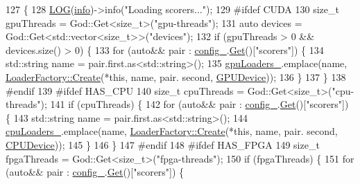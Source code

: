 \begin{DoxyCode}
127                       \{
128   \hyperlink{amun_2common_2logging_8h_a8cad147aca8c526d3c8a03ae14d5c87d}{LOG}(\hyperlink{namespacefix__hard_a31eedbb056537bc1bef47ad5e40eaa68}{info})->info(\textcolor{stringliteral}{"Loading scorers..."});
129 \textcolor{preprocessor}{#ifdef CUDA}
130   \textcolor{keywordtype}{size\_t} gpuThreads = God::Get<size\_t>(\textcolor{stringliteral}{"gpu-threads"});
131   \textcolor{keyword}{auto} devices = God::Get<std::vector<size\_t>>(\textcolor{stringliteral}{"devices"});
132   \textcolor{keywordflow}{if} (gpuThreads > 0 && devices.size() > 0) \{
133     \textcolor{keywordflow}{for} (\textcolor{keyword}{auto}&& pair : \hyperlink{classamunmt_1_1God_a5a0f3720bd8f1f19b7e50206e123f0e9}{config\_}.\hyperlink{classamunmt_1_1Config_a5257f41272d06c35bebe8130b5897d23}{Get}()[\textcolor{stringliteral}{"scorers"}]) \{
134       std::string name = pair.first.as<std::string>();
135       \hyperlink{classamunmt_1_1God_a2a713e550f5ee7296e7a66bd0b98339d}{gpuLoaders\_}.emplace(name, \hyperlink{classamunmt_1_1LoaderFactory_aaaf8621316a4c3832bcdfecbd5f69598}{LoaderFactory::Create}(*\textcolor{keyword}{this}, name, pair.
      second, \hyperlink{namespaceamunmt_a0f0dad0deb73c5a4c574d8c63833ab17a2ff3f7952956ae21ddcfa3564fe4de5f}{GPUDevice}));
136     \}
137   \}
138 \textcolor{preprocessor}{#endif}
139 \textcolor{preprocessor}{#ifdef HAS\_CPU}
140   \textcolor{keywordtype}{size\_t} cpuThreads = God::Get<size\_t>(\textcolor{stringliteral}{"cpu-threads"});
141   \textcolor{keywordflow}{if} (cpuThreads) \{
142     \textcolor{keywordflow}{for} (\textcolor{keyword}{auto}&& pair : \hyperlink{classamunmt_1_1God_a5a0f3720bd8f1f19b7e50206e123f0e9}{config\_}.\hyperlink{classamunmt_1_1Config_a5257f41272d06c35bebe8130b5897d23}{Get}()[\textcolor{stringliteral}{"scorers"}]) \{
143       std::string name = pair.first.as<std::string>();
144       \hyperlink{classamunmt_1_1God_aa18f86519617baf112214a7564a7bae0}{cpuLoaders\_}.emplace(name, \hyperlink{classamunmt_1_1LoaderFactory_aaaf8621316a4c3832bcdfecbd5f69598}{LoaderFactory::Create}(*\textcolor{keyword}{this}, name, pair.
      second, \hyperlink{namespaceamunmt_a0f0dad0deb73c5a4c574d8c63833ab17aafe1036ae66e30a8f082bda43072162a}{CPUDevice}));
145     \}
146   \}
147 \textcolor{preprocessor}{#endif}
148 \textcolor{preprocessor}{#ifdef HAS\_FPGA}
149   \textcolor{keywordtype}{size\_t} fpgaThreads = God::Get<size\_t>(\textcolor{stringliteral}{"fpga-threads"});
150   \textcolor{keywordflow}{if} (fpgaThreads) \{
151     \textcolor{keywordflow}{for} (\textcolor{keyword}{auto}&& pair : \hyperlink{classamunmt_1_1God_a5a0f3720bd8f1f19b7e50206e123f0e9}{config\_}.\hyperlink{classamunmt_1_1Config_a5257f41272d06c35bebe8130b5897d23}{Get}()[\textcolor{stringliteral}{"scorers"}]) \{

\end{DoxyCode}
